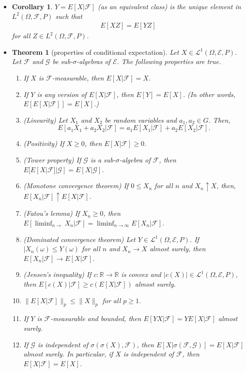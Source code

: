 \documentclass[10pt]{article}
\newtheorem{theorem}[lemma]{Theorem}
\newtheorem{corollary}[lemma]{Corollary}
\numberwithin{lemma}{section}
\newcommand{\mcal}[1]{\mathcal{#1}}
\newcommand{\Real}{\mathbb{R}}
\begin{document}
\begin{itemize}
  \item \begin{corollary}
    $Y = E[X|\mcal{F}]$ (as an equivalent class) is the unique element in $L^2(\Omega,\mcal{F},P)$ such that
    \begin{align*}
      E[XZ] = E[YZ]
    \end{align*}
    for all $Z \in L^2(\Omega,\mcal{F},P)$.
  \end{corollary}

  \item \begin{theorem}[properties of conditional expectation]
    Let $X \in \mcal{L}^1(\Omega,\mcal{E},P)$. Let $\mcal{F}$ and $\mcal{G}$ be sub-$\sigma$-algebras of $\mcal{E}$. The following properties are true.
    \begin{enumerate}
      \item If $X$ is $\mcal{F}$-measurable, then $E[X|\mcal{F}] = X$.
      \item If $Y$ is any version of $E[X|\mcal{F}]$, then $E[Y] = E[X]$. (In other words, $E[E[X|\mcal{F}]] = E[X]$.)
      \item (Linearity) Let $X_1$ and $X_2$ be random variables and $a_1, a_2 \in G$. Then, $$E[a_1 X_1 + a_2 X_2 | \mcal{F}] = a_1 E[X_1|\mcal{F}] + a_2 E[X_2|\mcal{F}].$$
      \item (Positivity) If $X \geq 0$, then $E[X|\mcal{F}] \geq 0$.      
      \item (Tower property) If $\mcal{G}$ is a sub-$\sigma$-algebra of $\mcal{F}$, then $E[E[X|\mcal{F}]|\mcal{G}] = E[X|\mcal{G}]$.
      \item (Monotone convergence theorem) If $0 \leq X_n$ for all $n$ and $X_n \uparrow X$, then, $E[X_n|\mcal{F}] \uparrow E[X|\mcal{F}]$.
      \item (Fatou's lemma) If $X_n \geq 0$, then $E[\liminf_{n \rightarrow} X_n|\mcal{F}] = \liminf_{n \rightarrow \infty} E[X_n|\mcal{F}]$.
      \item (Dominated convergence theorem) Let $Y \in \mcal{L}^1(\Omega, \mcal{E}, P)$. If $|X_n(\omega) \leq Y(\omega)$ for all $n$ and $X_n \rightarrow X$ almost surely, then $E[X_n|\mcal{F}]   \rightarrow E[X|\mcal{F}]$.
      \item (Jensen's inequality) If $c: \Real \rightarrow \Real$ is convex and $|c(X)| \in \mcal{L}^1(\Omega,\mcal{E},P)$, then $E[c(X)|\mcal{F}] \geq c(E[X|\mcal{F}])$ almost surely.
      \item $\| E[X|\mcal{F}] \|_p \leq \| X \|_p$ for all $p \geq 1$.
      \item If $Y$ is $\mcal{F}$-measurable and bounded, then $E[YX|\mcal{F}] = YE[X|\mcal{F}]$ almost surely.
      \item If $\mcal{G}$ is independent of $\sigma(\sigma(X),\mcal{F})$, then $E[X|\sigma(\mcal{F},\mcal{G})] = E[X|\mcal{F}]$ almost surely. In particular, if $X$ is independent of $\mcal{F}$, then $E[X|\mcal{F}] = E[X]$.
    \end{enumerate}
  \end{theorem}


\end{itemize}
\end{document}
